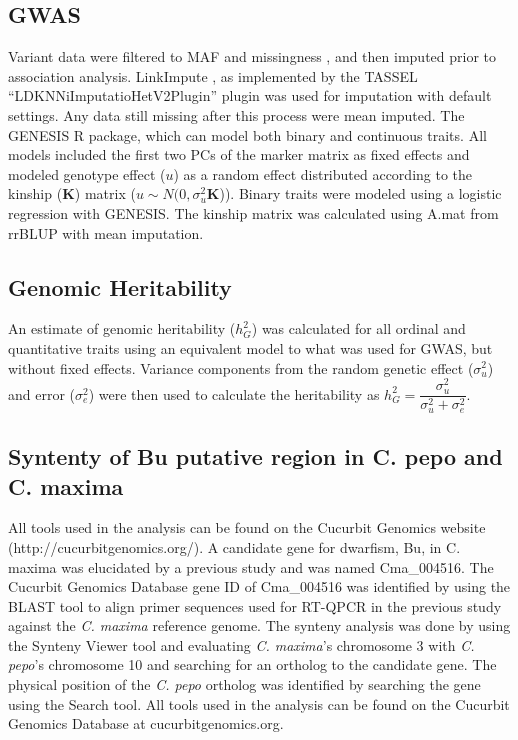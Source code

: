 \documentclass[utf8]{FrontiersinHarvard} %
\begin{document}
\subsection{GWAS}
Variant data were filtered to MAF  and missingness , and then imputed prior to association analysis. LinkImpute \citep{Money2015}, as implemented by the TASSEL \citep{Bradbury2007} “LDKNNiImputatioHetV2Plugin” plugin was used for imputation with default settings. Any data still missing after this process were mean imputed. The GENESIS \citep{Gogarten2019} R package, which can model both binary and continuous traits. All models included the first two PCs of the marker matrix as fixed effects and modeled genotype effect ($u$) as a random effect distributed according to the kinship ($\mathbf{K}$) matrix ($u \sim N(0,\sigma_{u}^{2}\textbf{K}$)). Binary traits were modeled using a logistic regression with GENESIS. The kinship matrix was calculated using A.mat from rrBLUP \citep{Endelman2011} with mean imputation.

\subsection{Genomic Heritability}

An estimate of genomic heritability ($h_{G}^{2}$) \citep{Campos2015} was calculated for all ordinal and quantitative traits using an equivalent model to what was used for GWAS, but without fixed effects. Variance components from the random genetic effect ($\sigma_{u}^{2}$) and error ($\sigma_{e}^{2}$) were then used to calculate the heritability as $h_{G}^{2} = \dfrac{\sigma_{u}^{2}}{\sigma_{u}^{2} + \sigma_{e}^{2}}$.

\subsection{Syntenty of Bu putative region in C. pepo and C. maxima}
All tools used in the analysis can be found on the Cucurbit Genomics website (http://cucurbitgenomics.org/). A candidate gene for dwarfism, Bu, in C. maxima was elucidated by a previous study \citep{Zhang2015} and was named Cma\_004516. The Cucurbit Genomics Database gene ID of Cma\_004516 was identified by using the BLAST tool to align primer sequences used for RT-QPCR in the previous study against the \textit{C. maxima} reference genome. The synteny analysis was done by using the Synteny Viewer tool and evaluating \textit{C. maxima}’s chromosome 3 with \textit{C. pepo}’s chromosome 10 and searching for an ortholog to the candidate gene. The physical position of the \textit{C. pepo} ortholog was identified by searching the gene using the Search tool. All tools used in the analysis can be found on the Cucurbit Genomics Database at cucurbitgenomics.org.
\end{document}
